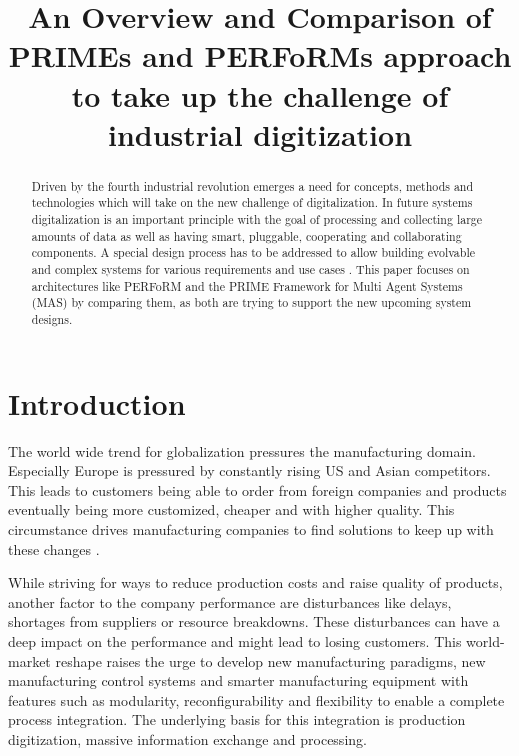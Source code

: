 \documentclass[conference,compsoc,hidelinks]{IEEEtran}
\begin{document}
\title{An Overview and Comparison of PRIMEs and PERFoRMs approach to take up the challenge of industrial digitization}

\author{
}

\maketitle

\begin{abstract}
Driven by the fourth industrial revolution emerges a need for concepts, methods and technologies which will take on the new challenge of digitalization. In future systems digitalization is an important principle with the goal of processing and collecting large amounts of data as well as having smart, pluggable, cooperating and collaborating components. A special design process has to be addressed to allow building evolvable and complex systems for various requirements and use cases \cite{Peres2017}. This paper focuses on architectures like PERFoRM and the PRIME Framework for Multi Agent Systems (MAS) by comparing them, as both are trying to support the new upcoming system designs.
\end{abstract}

\section{Introduction} %
The world wide trend for globalization pressures the manufacturing domain. Especially Europe is pressured by constantly rising US and Asian competitors. This leads to customers being able to order from foreign companies and products eventually being more customized, cheaper and with higher quality. This circumstance drives manufacturing companies to find solutions to keep up with these changes \cite{HarmonizedSystems}. 

While striving for ways to reduce production costs and raise quality of products, another factor to the company performance are disturbances like delays, shortages from suppliers or resource breakdowns. These disturbances can have a deep impact on the performance and might lead to losing customers. This world-market reshape raises the urge to develop new manufacturing paradigms, new manufacturing control systems and smarter manufacturing equipment with features such as modularity, reconfigurability and flexibility \cite{SCHEIFELE2014398} to enable a complete process integration. The underlying basis for this integration is production digitization, massive information exchange and processing. 
\end{document}
